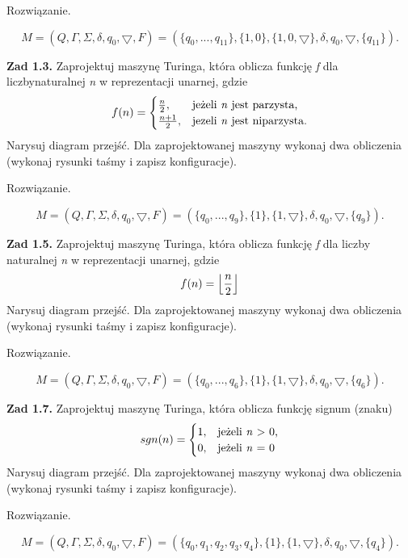 \documentclass[12pt]{article}
\DeclarePairedDelimiter\floor{\lfloor}{\rfloor}
\begin{document}
 Rozwiązanie.
 
\[M=(Q,\Gamma,\Sigma,\delta,q_0,\bigtriangledown,F)=(\{q_0, ... ,q_{11}\},\{1,0\},\{1,0,\bigtriangledown\},\delta,q_0,\bigtriangledown,\{q_{11}\}).\]

\newpage

\noindent\textbf{Zad 1.3.} Zaprojektuj  maszynę  Turinga,  która  oblicza  funkcję \textit{f} dla  liczbynaturalnej \textit{n} w reprezentacji unarnej, gdzie
\[f(n)=
	\begin{cases}
	\frac{n}{2}, & \text{jeżeli \textit{n} jest parzysta,} \\
   	\frac{n+1}{2}, & \text{jezeli \textit{n} jest niparzysta.}
	\end{cases}	
\]
Narysuj diagram przejść. Dla zaprojektowanej maszyny wykonaj dwa obliczenia (wykonaj rysunki taśmy i zapisz konfiguracje).

 Rozwiązanie.
 
\[M=(Q,\Gamma,\Sigma,\delta,q_0,\bigtriangledown,F)=(\{q_0,...,q_9\},\{1\},\{1,\bigtriangledown\},\delta,q_0,\bigtriangledown,\{q_9\}).\]

\newpage

\noindent\textbf{Zad 1.5.} Zaprojektuj  maszynę  Turinga,  która  oblicza  funkcję \textit{f} dla  liczby naturalnej \textit{n} w reprezentacji unarnej, gdzie
\[f(n)=\floor*{\frac{n}{2}}\]
Narysuj diagram przejść. Dla zaprojektowanej maszyny wykonaj dwa obliczenia (wykonaj rysunki taśmy i zapisz konfiguracje).

 Rozwiązanie.

\[M=(Q,\Gamma,\Sigma,\delta,q_0,\bigtriangledown,F)=(\{q_0,...,q_6\},\{1\},\{1,\bigtriangledown\},\delta,q_0,\bigtriangledown,\{q_6\}).\]

\newpage

\noindent\textbf{Zad 1.7.} Zaprojektuj maszynę Turinga, która oblicza funkcję signum (znaku)
\[sgn(n)=
	\begin{cases}
	1, & \text{jeżeli \textit{n} > 0,} \\
	0, & \text{jeżeli \textit{n} = 0}
	\end{cases}
\]
Narysuj diagram przejść. Dla zaprojektowanej maszyny wykonaj dwa obliczenia (wykonaj rysunki taśmy i zapisz konfiguracje).

 Rozwiązanie.
 
\[M=(Q,\Gamma,\Sigma,\delta,q_0,\bigtriangledown,F)=(\{q_0,q_1,q_2,q_3,q_4\},\{1\},\{1,\bigtriangledown\},\delta,q_0,\bigtriangledown,\{q_4\}).\]

\newpage
\end{document}
